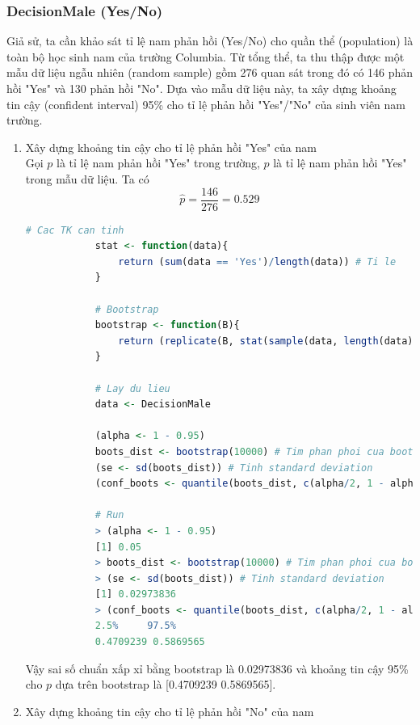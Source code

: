 \documentclass[a4paper,12pt]{article}
\begin{document}
	\subsubsection{DecisionMale (Yes/No)}
	Giả sử, ta cần khảo sát tỉ lệ nam phản hồi (Yes/No) cho quần thể (population) là toàn bộ học sinh nam của trường Columbia. Từ tổng thể, ta thu thập được một mẫu dữ liệu ngẫu nhiên (random sample) gồm 276 quan sát trong đó có 146 phản hồi "Yes" và 130 phản hồi "No". Dựa vào mẫu dữ liệu này, ta xây dựng khoảng tin cậy
	(confident interval) 95\% cho tỉ lệ phản hồi "Yes"/"No" của sinh viên nam trường.
	\begin{enumerate}[label=\alph*)]
		\item Xây dựng khoảng tin cậy cho tỉ lệ phản hồi "Yes" của nam\\
		
		Gọi $p$ là tỉ lệ nam phản hồi "Yes" trong trường, $\hat{p}$ là tỉ lệ nam phản hồi "Yes" trong mẫu dữ liệu. Ta có
		$$\hat{p} = \frac{146}{276} = 0.529$$
		\begin{lstlisting}[language=R]
			# Cac TK can tinh
			stat <- function(data){
				return (sum(data == 'Yes')/length(data)) # Ti le
			}
			
			# Bootstrap
			bootstrap <- function(B){
				return (replicate(B, stat(sample(data, length(data), replace = TRUE))))
			}
			
			# Lay du lieu
			data <- DecisionMale
			
			(alpha <- 1 - 0.95)
			boots_dist <- bootstrap(10000) # Tim phan phoi cua bootstrap
			(se <- sd(boots_dist)) # Tinh standard deviation
			(conf_boots <- quantile(boots_dist, c(alpha/2, 1 - alpha/2))) # Tim khoang tin cay cho p
			
			# Run
			> (alpha <- 1 - 0.95)
			[1] 0.05
			> boots_dist <- bootstrap(10000) # Tim phan phoi cua bootstrap
			> (se <- sd(boots_dist)) # Tinh standard deviation
			[1] 0.02973836
			> (conf_boots <- quantile(boots_dist, c(alpha/2, 1 - alpha/2))) # Tim khoang tin cay cho p
			2.5%     97.5% 
			0.4709239 0.5869565 
		\end{lstlisting}
		
		Vậy sai số chuẩn xấp xỉ bằng bootstrap là 0.02973836 và khoảng tin cậy 95\% cho $p$ dựa trên bootstrap là [0.4709239 0.5869565].
		
		\item Xây dựng khoảng tin cậy cho tỉ lệ phản hồi "No" của nam\\
		

\end{enumerate}
\end{document}

